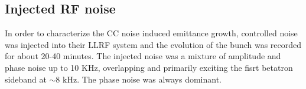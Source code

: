  \subsection{Injected RF noise} 

 In order to characterize the CC noise induced emittance growth, controlled noise was injected into their LLRF system and the evolution of the bunch was recorded for about 20-40 minutes. The injected noise was a mixture of amplitude and phase noise up to 10 KHz, overlapping and primarily exciting the fisrt betatron sideband at $\sim 8$ kHz. The phase noise was always dominant. 